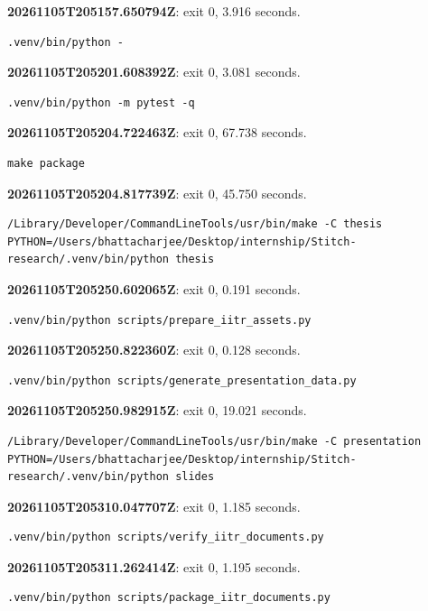 \noindent\textbf{20261105T205157.650794Z}: exit 0, 3.916 seconds.
\begin{lstlisting}[numbers=none]
.venv/bin/python -
\end{lstlisting}

\noindent\textbf{20261105T205201.608392Z}: exit 0, 3.081 seconds.
\begin{lstlisting}[numbers=none]
.venv/bin/python -m pytest -q
\end{lstlisting}

\noindent\textbf{20261105T205204.722463Z}: exit 0, 67.738 seconds.
\begin{lstlisting}[numbers=none]
make package
\end{lstlisting}

\noindent\textbf{20261105T205204.817739Z}: exit 0, 45.750 seconds.
\begin{lstlisting}[numbers=none]
/Library/Developer/CommandLineTools/usr/bin/make -C thesis PYTHON=/Users/bhattacharjee/Desktop/internship/Stitch-research/.venv/bin/python thesis
\end{lstlisting}

\noindent\textbf{20261105T205250.602065Z}: exit 0, 0.191 seconds.
\begin{lstlisting}[numbers=none]
.venv/bin/python scripts/prepare_iitr_assets.py
\end{lstlisting}

\noindent\textbf{20261105T205250.822360Z}: exit 0, 0.128 seconds.
\begin{lstlisting}[numbers=none]
.venv/bin/python scripts/generate_presentation_data.py
\end{lstlisting}

\noindent\textbf{20261105T205250.982915Z}: exit 0, 19.021 seconds.
\begin{lstlisting}[numbers=none]
/Library/Developer/CommandLineTools/usr/bin/make -C presentation PYTHON=/Users/bhattacharjee/Desktop/internship/Stitch-research/.venv/bin/python slides
\end{lstlisting}

\noindent\textbf{20261105T205310.047707Z}: exit 0, 1.185 seconds.
\begin{lstlisting}[numbers=none]
.venv/bin/python scripts/verify_iitr_documents.py
\end{lstlisting}

\noindent\textbf{20261105T205311.262414Z}: exit 0, 1.195 seconds.
\begin{lstlisting}[numbers=none]
.venv/bin/python scripts/package_iitr_documents.py
\end{lstlisting}

